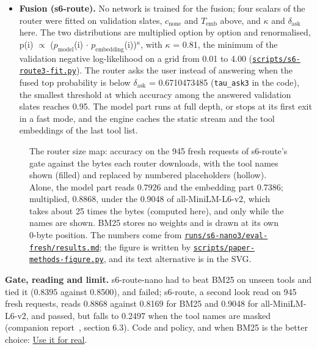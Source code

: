 \documentclass[10pt]{article}
\begin{document}
\begin{itemize}
\item \textbf{Fusion (s6-route).} No network is trained for the fusion; four scalars of the router were fitted on validation slates, $c_{\mathrm{none}}$ and $T_{\mathrm{emb}}$ above, and $\kappa$ and $\delta_{\mathrm{ask}}$ here. The two distributions are multiplied option by option and renormalised, p(i) $\propto$ ($p_{\mathrm{model}}$(i) $\cdot$ $p_{\mathrm{embedding}}$(i))$^{\kappa}$, with $\kappa$ = 0.81, the minimum of the validation negative log-likelihood on a grid from 0.01 to 4.00 (\href{https://github.com/maxgfr/skycmd/blob/main/scripts/s6-route3-fit.py}{\texttt{scripts/\allowbreak{}s6-route3-fit.py}}). The router asks the user instead of answering when the fused top probability is below $\delta_{\mathrm{ask}}$ = 0.6710473485 (\texttt{tau\_\allowbreak{}ask3} in the code), the smallest threshold at which accuracy among the answered validation slates reaches 0.95. The model part runs at full depth, or stops at its first exit in a fast mode, and the engine caches the static stream and the tool embeddings of the last tool list.
\end{itemize}

\begin{figure}[t]
\centering

\caption[The router size map.]{The router size map: accuracy on the 945 fresh requests of s6-route's gate against the bytes each router downloads, with the tool names shown (filled) and replaced by numbered placeholders (hollow). Alone, the model part reads 0.7926 and the embedding part 0.7386; multiplied, 0.8868, under the 0.9048 of all-MiniLM-L6-v2, which takes about 25 times the bytes (computed here), and only while the names are shown. BM25 stores no weights and is drawn at its own 0-byte position. The numbers come from \href{https://github.com/maxgfr/skycmd/blob/main/runs/s6-nano3/eval-fresh/results.md}{\texttt{runs/\allowbreak{}s6-nano3/\allowbreak{}eval-fresh/\allowbreak{}results.md}}; the figure is written by \href{https://github.com/maxgfr/skycmd/blob/main/scripts/paper-methods-figure.py}{\texttt{scripts/\allowbreak{}paper-methods-figure.py}}, and its text alternative is in the SVG.}\label{fig:2}
\end{figure}

\textbf{Gate, reading and limit.} s6-route-nano had to beat BM25 on unseen tools and tied it (0.8395 against 0.8500), and failed; s6-route, a second look read on 945 fresh requests, reads 0.8868 against 0.8169 for BM25 and 0.9048 for all-MiniLM-L6-v2, and passed, but falls to 0.2497 when the tool names are masked (companion report~\cite{golfier2026skycmd}, section 6.3). Code and policy, and when BM25 is the better choice: \href{https://maxgfr.github.io/skycmd/use/\#tool-routing}{Use it for real}.
\end{document}
